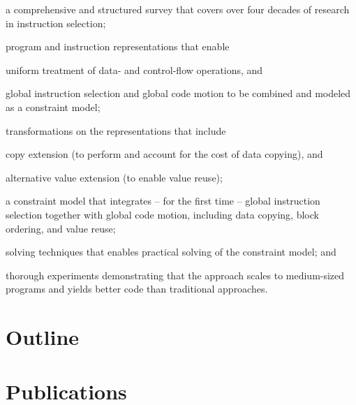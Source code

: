 \begin{contributions}
\item {}
    a comprehensive and structured survey that covers over four decades of
    research in instruction selection;
  \item {}
    program and instruction representations that enable
    \begin{contributions}
      \item uniform treatment of data- and control-flow operations, and
      \item global instruction selection and global code motion to be combined
        and modeled as a constraint model;
    \end{contributions}
  \item {}
    transformations on the representations that include
    \begin{contributions}
      \item copy extension (to perform and account for the cost of data
        copying), and
      \item alternative value extension (to enable value reuse);
    \end{contributions}
  \item {}
    a constraint model that integrates -- for the first time -- global
    instruction selection together with global code motion, including data
    copying, block ordering, and value reuse;
  \item {}
    solving techniques that enables practical solving of the constraint model;
    and
  \item {}
    thorough experiments demonstrating that the approach scales to medium-sized
    programs and yields better code than traditional approaches.
\end{contributions}


\section{Outline}


\section{Publications}

